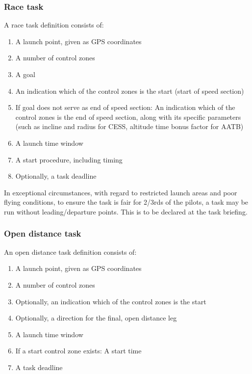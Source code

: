 \documentclass{article}
\begin{document}
\subsubsection{Race task}
A race task definition consists of:
\begin{enumerate}
    \item A launch point, given as GPS coordinates
    \item A number of control zones
    \item A goal
    \item
        An indication which of the control zones is the start (start of speed
        section)
    \item
        If goal does not serve as end of speed section: An indication which of
        the control zones is the end of speed section, along with its specific
        parameters (such as incline and radius for CESS, altitude time bonus
        factor for AATB)
    \item A launch time window
    \item A start procedure, including timing
    \item Optionally, a task deadline
\end{enumerate}

\begin{pg}
In exceptional circumstances, with regard to restricted launch areas and poor
flying conditions, to ensure the task is fair for 2/3rds of the pilots, a task
may be run without leading/departure points. This is to be declared at the task
briefing.
\end{pg}

\subsubsection{Open distance task}
An open distance task definition consists of:
\begin{enumerate}
    \item A launch point, given as GPS coordinates
    \item A number of control zones
    \item Optionally, an indication which of the control zones is the start
    \item Optionally, a direction for the final, open distance leg
    \item A launch time window
    \item If a start control zone exists: A start time
    \item A task deadline
\end{enumerate}
\end{document}
